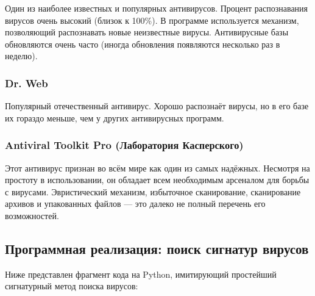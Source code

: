 Один из наиболее известных и популярных антивирусов. Процент распознавания вирусов очень высокий (близок к 100\%). В программе используется механизм, позволяющий распознавать новые неизвестные вирусы. Антивирусные базы обновляются очень часто (иногда обновления появляются несколько раз в неделю).
 
\subsubsection{Dr. Web}
 
Популярный отечественный антивирус. Хорошо распознаёт вирусы, но в его базе их гораздо меньше, чем у других антивирусных программ.
 
\subsubsection{Antiviral Toolkit Pro (Лаборатория Касперского)}
 
Этот антивирус признан во всём мире как один из самых надёжных. Несмотря на простоту в использовании, он обладает всем необходимым арсеналом для борьбы с вирусами. Эвристический механизм, избыточное сканирование, сканирование архивов и упакованных файлов — это далеко не полный перечень его возможностей.
 
\subsection{Программная реализация: поиск сигнатур вирусов}
 
Ниже представлен фрагмент кода на Python, имитирующий простейший сигнатурный метод поиска вирусов:
 
